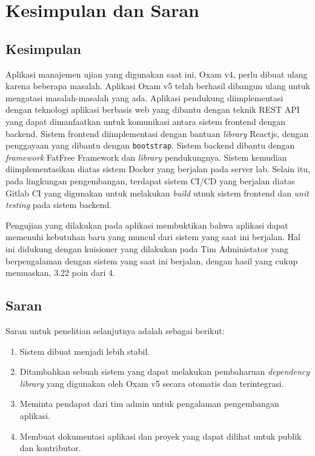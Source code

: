 \chapter{Kesimpulan dan Saran}
\label{chap:kesimpulan-saran}

\section{Kesimpulan}
    Aplikasi manajemen ujian yang digunakan saat ini, Oxam v4, perlu dibuat ulang karena beberapa masalah. 
    Aplikasi Oxam v5 telah berhasil dibangun ulang untuk mengatasi masalah-masalah yang ada.
    Aplikasi pendukung diimplementasi dengan teknologi aplikasi berbasis web yang dibantu dengan teknik REST API
    yang dapat dimanfaatkan untuk komunikasi antara sistem frontend dengan backend. Sistem frontend diimplementasi
    dengan bantuan \textit{library} Reactjs, dengan penggayaan yang dibantu dengan \texttt{bootstrap}. Sistem
    backend dibantu dengan \textit{framework} FatFree Framework dan \textit{library} pendukungnya. Sistem
    kemudian diimplementasikan diatas sistem Docker yang berjalan pada server lab. Selain itu, pada lingkungan
    pengembangan, terdapat sistem CI/CD yang berjalan diatas Gitlab CI yang digunakan untuk melakukan
    \textit{build} utnuk sistem frontend dan \textit{unit testing} pada sistem backend.
    
    Pengujian yang dilakukan pada aplikasi membuktikan  bahwa aplikasi dapat memenuhi kebutuhan baru yang muncul
    dari sistem yang saat ini berjalan. Hal ini didukung dengan kuisioner yang dilakukan pada Tim Administator
    yang berpengalaman dengan sistem yang saat ini berjalan, dengan hasil yang cukup memuaskan, 3.22 poin dari 4.
    
\section{Saran}
    Saran untuk penelitian selanjutnya adalah sebagai berikut:
    \begin{enumerate}
        \item Sistem dibuat menjadi lebih stabil.
        \item Ditambahkan sebuah sistem yang dapat melakukan pembaharuan \textit{dependency library} yang
            digunakan oleh Oxam v5 secara otomatis dan terintegrasi.
        \item Meminta pendapat dari tim admin untuk pengalaman pengembangan aplikasi.
        \item Membuat dokumentasi aplikasi dan proyek yang dapat dilihat untuk publik dan kontributor.
    \end{enumerate}